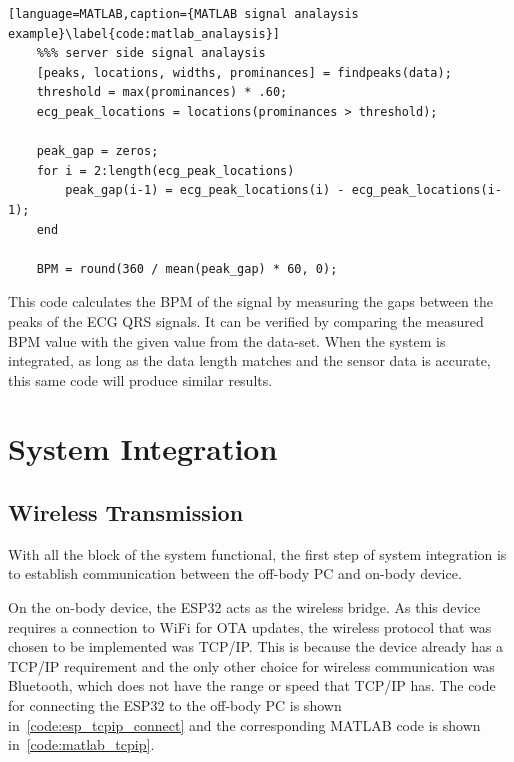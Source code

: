 \begin{lstlisting}[language=MATLAB,caption={MATLAB signal analaysis example}\label{code:matlab_analaysis}]
    %%% server side signal analaysis
    [peaks, locations, widths, prominances] = findpeaks(data);
    threshold = max(prominances) * .60;
    ecg_peak_locations = locations(prominances > threshold);

    peak_gap = zeros;
    for i = 2:length(ecg_peak_locations)
        peak_gap(i-1) = ecg_peak_locations(i) - ecg_peak_locations(i-1);
    end

    BPM = round(360 / mean(peak_gap) * 60, 0);
\end{lstlisting}

This code calculates the BPM of the signal by measuring the gaps between the peaks of the ECG QRS signals.
It can be verified by comparing the measured BPM value with the given value from the data-set.
When the system is integrated, as long as the data length matches and the sensor data is accurate,
this same code will produce similar results.


\section{System Integration}
\subsection{Wireless Transmission}
With all the block of the system functional,
the first step of system integration is to establish communication between the off-body PC and on-body device.

On the on-body device, the ESP32 acts as the wireless bridge.
As this device requires a connection to WiFi for OTA updates, the wireless protocol that was chosen to be implemented was TCP/IP.
This is because the device already has a TCP/IP requirement and the only other choice for wireless communication was Bluetooth, which does not have the range or speed that TCP/IP has.
The code for connecting the ESP32 to the off-body PC is shown in~\autoref{code:esp_tcpip_connect} and the corresponding MATLAB code is shown in~\autoref{code:matlab_tcpip}.


